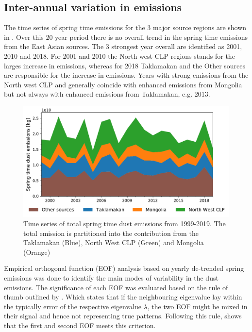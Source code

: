 \subsection{Inter-annual variation in emissions}
The time series of spring time emissions for the 3 major source regions are shown in . Over this 20 year period there is no overall trend in the spring time emissions from the East Asian sources. The 3 strongest year overall are identified as 2001, 2010 and 2018. For 2001 and 2010 the North west CLP regions stands for the larges increase in emissions, whereas for 2018 Taklamakan and the Other sources are responsible for the increase in emissions. Years with strong emissions from the North west CLP and generally coincide with enhanced emissions from Mongolia but not always with enhanced emissions from Taklamakan, e.g. 2013.   

\begin{figure}[htbp]
    \centering
    \includegraphics[width=\textwidth]{../figs/Emission_timeseries.pdf}
    \caption{Time series of total spring time dust emissions from 1999-2019. The total emission is partitioned into the contribution from the Taklamakan (Blue), North West CLP (Green) and Mongolia (Orange) }
    \label{fig:emission_timeseries}
\end{figure}
Empirical orthogonal function (EOF) analysis based on yearly de-trended spring emissions was done to identify the main modes of variability in the dust emissions. The significance of each EOF was evaluated based on the rule of thumb outlined by \textcite{north1982sampling}. Which states that if the neighbouring eigenvalue lay within the typically error of the respective eigenvalue $\lambda$, the two EOF might be mixed in their signal and hence not representing true patterns. Following this rule,  shows that the first and second EOF meets this criterion.     

